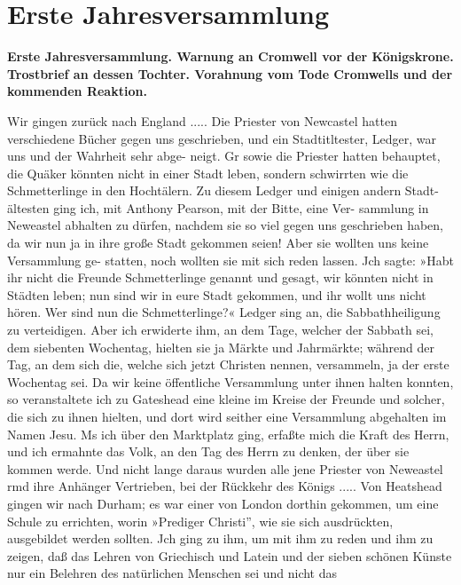 

\chapter[Erste Jahresversammlung]{Erste Jahresversammlung}

\begin{center}
\textbf{Erste Jahresversammlung. Warnung an Cromwell vor 
der Königskrone. Trostbrief an dessen Tochter. Vorahnung 
vom Tode Cromwells und der kommenden Reaktion.}
\end{center}


Wir gingen zurück nach England ..... Die Priester
von Newcastel hatten verschiedene Bücher gegen uns geschrieben,
und ein Stadtitltester, Ledger, war uns und der Wahrheit sehr abge-
neigt. Gr sowie die Priester hatten behauptet, die Quäker könnten
nicht in einer Stadt leben, sondern schwirrten wie die Schmetterlinge
in den Hochtälern. Zu diesem Ledger und einigen andern Stadt-
ältesten ging ich, mit Anthony Pearson, mit der Bitte, eine Ver-
sammlung in Neweastel abhalten zu dürfen, nachdem sie so viel
gegen uns geschrieben haben, da wir nun ja in ihre große Stadt
gekommen seien! Aber sie wollten uns keine Versammlung ge-
statten, noch wollten sie mit sich reden lassen. Jch sagte: »Habt
ihr nicht die Freunde Schmetterlinge genannt und gesagt, wir
könnten nicht in Städten leben; nun sind wir in eure Stadt gekommen,
und ihr wollt uns nicht hören. Wer sind nun die Schmetterlinge?«
Ledger sing an, die Sabbathheiligung zu verteidigen. Aber ich
erwiderte ihm, an dem Tage, welcher der Sabbath sei, dem siebenten
Wochentag, hielten sie ja Märkte und Jahrmärkte; während der Tag,
an dem sich die, welche sich jetzt Christen nennen, versammeln, ja
der erste Wochentag sei. Da wir keine öffentliche Versammlung
unter ihnen halten konnten, so veranstaltete ich zu Gateshead
eine kleine im Kreise der Freunde und solcher, die sich zu ihnen
hielten, und dort wird seither eine Versammlung abgehalten im
Namen Jesu. Ms ich über den Marktplatz ging, erfaßte mich
die Kraft des Herrn, und ich ermahnte das Volk, an den Tag
des Herrn zu denken, der über sie kommen werde. Und nicht
lange daraus wurden alle jene Priester von Neweastel rmd ihre
Anhänger Vertrieben, bei der Rückkehr des Königs ..... Von
Heatshead gingen wir nach Durham; es war einer von London
dorthin gekommen, um eine Schule zu errichten, worin »Prediger
Christi'', wie sie sich ausdrückten, ausgebildet werden sollten. Jch
ging zu ihm, um mit ihm zu reden und ihm zu zeigen, daß das
Lehren von Griechisch und Latein und der sieben schönen Künste
nur ein Belehren des natürlichen Menschen sei und nicht das


